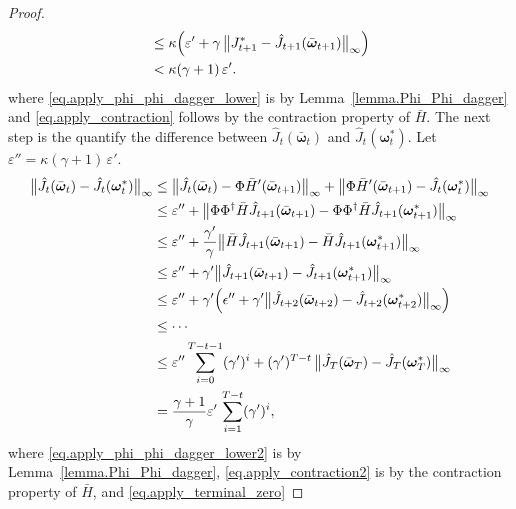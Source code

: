 \documentclass[11pt, notitlepage]{article}
\newcommand{\1}{\mathbbm{1}}
\begin{document}
\begin{proof}
\begin{align}
        &\leq \kappa\Bigl( \varepsilon' + \gamma \, \bigl\|J_{t+1}^* - \hat{J}_{t+1}(\bar{\boldsymbol{\omega}}_{t+1})\bigr\|_\infty \Bigr) \label{eq.apply_contraction}\\
        &< \kappa (\gamma+1)\, \varepsilon'. \nonumber
    \end{align}
    where \eqref{eq.apply_phi_phi_dagger_lower} is by Lemma~\ref{lemma.Phi_Phi_dagger} and \eqref{eq.apply_contraction} follows by the contraction property of $\bar{H}$. The next step is the quantify the difference between $\hat{J}_t(\bar{\boldsymbol{\omega}}_t)$ and $\hat{J}_t(\boldsymbol{\omega}_t^*)$. Let $\varepsilon'' = \kappa (\gamma+1)\, \varepsilon'$.
    \begin{align}
        \bigl \|\hat{J}_t(\bar{\boldsymbol{\omega}}_t) - \hat{J}_t(\boldsymbol{\omega}_t^*) \bigr\|_\infty
        &\leq \bigl \|\hat{J}_t(\bar{\boldsymbol{\omega}}_t) - \Phi \bar{H}' (\bar{\boldsymbol{\omega}}_{t+1}) \bigr\|_\infty + \bigl \|\Phi \bar{H}' (\bar{\boldsymbol{\omega}}_{t+1}) - \hat{J}_t(\boldsymbol{\omega}_t^*) \bigr\|_\infty\nonumber\\
        &\le \varepsilon'' + \bigl \|\Phi \Phi^{\dagger} \bar{H} \hat{J}_{t+1}(\bar{\boldsymbol{\omega}}_{t+1}) - \Phi \Phi^{\dagger} \bar{H} \hat{J}_{t+1}(\boldsymbol{\omega}_{t+1}^*) \bigr\|_\infty\nonumber\\
        &\leq \varepsilon'' + \frac{\gamma'}{\gamma} \bigl \|\bar{H} \hat{J}_{t+1}(\bar{\boldsymbol{\omega}}_{t+1}) - \bar{H} \hat{J}_{t+1}(\boldsymbol{\omega}_{t+1}^*)\bigr\|_\infty\label{eq.apply_phi_phi_dagger_lower2}\\
        &\leq \varepsilon'' + \gamma' \bigl \|\hat{J}_{t+1}(\bar{\boldsymbol{\omega}}_{t+1}) - \hat{J}_{t+1}(\boldsymbol{\omega}_{t+1}^*) \bigr\|_\infty\label{eq.apply_contraction2}\\
        &\le \varepsilon'' + \gamma' \Bigl( \epsilon'' + \gamma' \bigl \|\hat{J}_{t+2}(\bar{\boldsymbol{\omega}}_{t+2}) - \hat{J}_{t+2}(\boldsymbol{\omega}_{t+2}^*) \bigr\|_\infty \Bigr) \nonumber \\
        &\le \cdots \nonumber \\
        &\le \varepsilon'' \sum_{i=0}^{T-t-1}(\gamma')^i + (\gamma')^{T-t} \,  \bigl \|\hat{J}_{T}(\bar{\boldsymbol{\omega}}_{T}) - \hat{J}_{T}(\boldsymbol{\omega}_{T}^*) \bigr\|_\infty \nonumber\\
        &= \frac{\gamma+1}{\gamma} \varepsilon' \, \sum_{i=1}^{T-t}(\gamma')^i,\label{eq.apply_terminal_zero}
    \end{align}
    where \eqref{eq.apply_phi_phi_dagger_lower2} is by Lemma~\ref{lemma.Phi_Phi_dagger}, \eqref{eq.apply_contraction2} is by the contraction property of $\bar{H}$, and \eqref{eq.apply_terminal_zero}

\end{proof}
\end{document}
